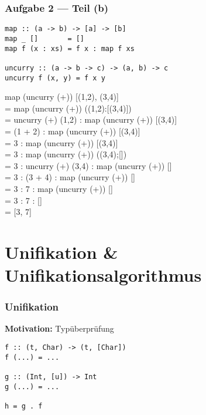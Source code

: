 \documentclass{beamer}
\begin{document}
\begin{frame}[fragile, t] \frametitle{Aufgabe 2 --- Teil (b)}
	
	\begin{lstlisting}
map :: (a -> b) -> [a] -> [b]
map _ []       = []
map f (x : xs) = f x : map f xs

uncurry :: (a -> b -> c) -> (a, b) -> c
uncurry f (x, y) = f x y
	\end{lstlisting}
	
	\footnotesize
	\begin{ttfamily}
		map (uncurry (+)) [(1,2), (3,4)] \\ \pause
		= map (uncurry (+)) ((1,2):[(3,4)]) \\
		= uncurry (+) (1,2) : map (uncurry (+)) [(3,4)] \\
		= (1 + 2) : map (uncurry (+)) [(3,4)] \\
		= 3 : map (uncurry (+)) [(3,4)] \\
		= 3 : map (uncurry (+)) ((3,4);[]) \\
		= 3 : uncurry (+) (3,4) : map (uncurry (+)) [] \\
		= 3 : (3 + 4) : map (uncurry (+)) [] \\
		= 3 : 7 : map (uncurry (+)) [] \\
		= 3 : 7 : [] \\
		= [3, 7]
	\end{ttfamily}
	
	\bigskip \pause

\end{frame}



\section{Unifikation \& Unifikationsalgorithmus}


\begin{frame}[fragile] \frametitle{Unifikation}
		\textbf{Motivation:} Typüberprüfung
		 
		\begin{lstlisting}
f :: (t, Char) -> (t, [Char])
f (...) = ... 

g :: (Int, [u]) -> Int
g (...) = ...

h = g . f
		\end{lstlisting}
\end{frame}
\end{document}

